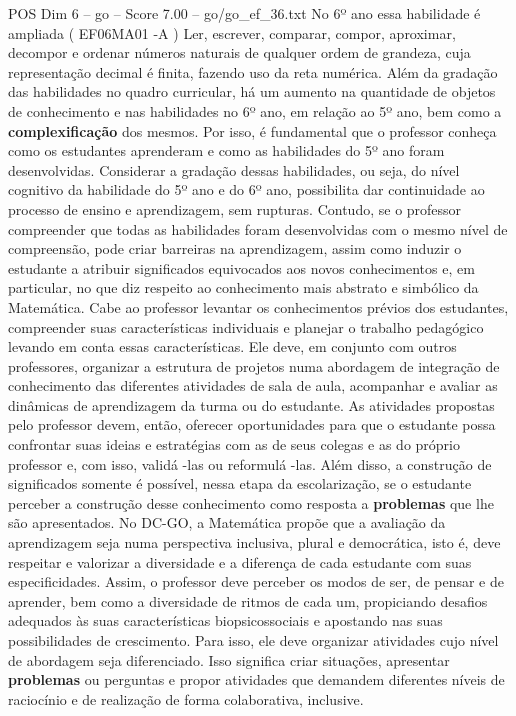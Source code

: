\begin{textsample}{POS Dim 6 – go – Score 7.00 – go/go\_ef\_36.txt}
No 6º ano essa habilidade é ampliada ( EF06MA01 -A ) Ler, escrever, comparar, compor, aproximar, decompor e ordenar números naturais de qualquer ordem de grandeza, cuja representação decimal é finita, fazendo uso da reta numérica.
Além da gradação das habilidades no quadro curricular, há um aumento na quantidade de objetos de conhecimento e nas habilidades no 6º ano, em relação ao 5º ano, bem como a \textbf{complexificação} dos mesmos.
Por isso, é fundamental que o professor conheça como os estudantes aprenderam e como as habilidades do 5º ano foram desenvolvidas.
Considerar a gradação dessas habilidades, ou seja, do nível cognitivo da habilidade do 5º ano e do 6º ano, possibilita dar continuidade ao processo de ensino e aprendizagem, sem rupturas.
Contudo, se o professor compreender que todas as habilidades foram desenvolvidas com o mesmo nível de compreensão, pode criar barreiras na aprendizagem, assim como induzir o estudante a atribuir significados equivocados aos novos conhecimentos e, em particular, no que diz respeito ao conhecimento mais abstrato e simbólico da Matemática.
Cabe ao professor levantar os conhecimentos prévios dos estudantes, compreender suas características individuais e planejar o trabalho pedagógico levando em conta essas características.
Ele deve, em conjunto com outros professores, organizar a estrutura de projetos numa abordagem de integração de conhecimento das diferentes atividades de sala de aula, acompanhar e avaliar as dinâmicas de aprendizagem da turma ou do estudante.
As atividades propostas pelo professor devem, então, oferecer oportunidades para que o estudante possa confrontar suas ideias e estratégias com as de seus colegas e as do próprio professor e, com isso, validá -las ou reformulá -las.
Além disso, a construção de significados somente é possível, nessa etapa da escolarização, se o estudante perceber a construção desse conhecimento como resposta a \textbf{problemas} que lhe são apresentados.
No DC-GO, a Matemática propõe que a avaliação da aprendizagem seja numa perspectiva inclusiva, plural e democrática, isto é, deve respeitar e valorizar a diversidade e a diferença de cada estudante com suas especificidades.
Assim, o professor deve perceber os modos de ser, de pensar e de aprender, bem como a diversidade de ritmos de cada um, propiciando desafios adequados às suas características biopsicossociais e apostando nas suas possibilidades de crescimento.
Para isso, ele deve organizar atividades cujo nível de abordagem seja diferenciado.
Isso significa criar situações, apresentar \textbf{problemas} ou perguntas e propor atividades que demandem diferentes níveis de raciocínio e de realização de forma colaborativa, inclusive.

\end{textsample}
